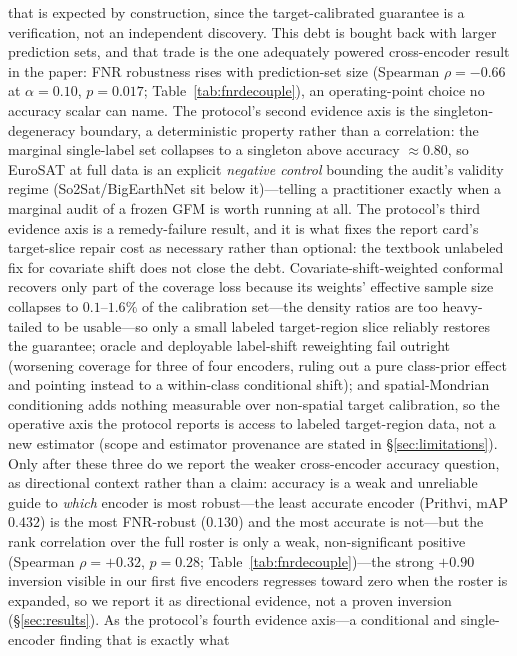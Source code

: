 \documentclass[journal]{IEEEtran}
\renewcommand{\_}{\textunderscore\allowbreak}
\begin{document}
that is expected by construction, since the target-calibrated guarantee is a verification, not an
independent discovery. This debt is bought back with larger prediction sets, and that trade is the one
adequately powered cross-encoder result in the paper: FNR robustness rises with prediction-set size
(Spearman $\rho=-0.66$ at $\alpha{=}0.10$, $p{=}0.017$; Table~\ref{tab:fnrdecouple}), an operating-point
choice no accuracy scalar can name. The protocol's second evidence axis is the singleton-degeneracy boundary, a
deterministic property rather than a correlation: the marginal single-label set collapses to a singleton
above accuracy $\approx0.80$, so EuroSAT at full data is an explicit \emph{negative control} bounding the
audit's validity regime (So2Sat/BigEarthNet sit below it)---telling a practitioner exactly when a marginal
audit of a frozen GFM is worth running at all. The protocol's third evidence axis is a remedy-failure result, and it is what fixes the
report card's target-slice repair cost as necessary rather than optional: the
textbook unlabeled fix for covariate shift does not close the debt. Covariate-shift-weighted conformal
\citep{tibshirani2019covariate} recovers only part of the coverage loss because its weights' effective
sample size collapses to $0.1$--$1.6\%$ of the calibration set---the density ratios are too heavy-tailed to
be usable---so only a small labeled target-region slice reliably restores the guarantee; oracle and
deployable label-shift reweighting fail outright (worsening coverage for three of four encoders, ruling
out a pure class-prior effect and pointing instead to a within-class conditional shift); and
spatial-Mondrian conditioning adds nothing measurable over non-spatial target calibration, so the
operative axis the protocol reports is access to labeled target-region data, not a new estimator (scope
and estimator provenance are stated in \S\ref{sec:limitations}). Only after these three do we report
the weaker cross-encoder accuracy question, as directional context rather than a claim: accuracy is a weak
and unreliable guide to \emph{which} encoder is most robust---the least accurate encoder (Prithvi, mAP
$0.432$) is the most FNR-robust ($0.130$) and the most accurate is not---but the rank correlation over the
full roster is only a weak, non-significant positive (Spearman $\rho=+0.32$, $p{=}0.28$;
Table~\ref{tab:fnrdecouple})---the strong $+0.90$ inversion visible in our first five encoders regresses
toward zero when the roster is expanded, so we report it as directional evidence, not a proven inversion
(\S\ref{sec:results}). As the protocol's fourth evidence axis---a conditional and single-encoder finding that is exactly what
\end{document}
